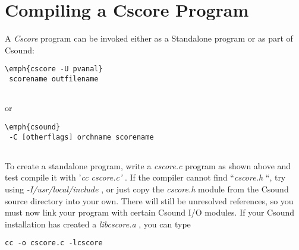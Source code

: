 \begin{comment}
\documentclass[10pt]{article}
\usepackage{fullpage, graphicx, url}
\setlength{\parskip}{1ex}
\setlength{\parindent}{0ex}
\title{Compiling a Cscore Program}



\begin{tabular}{ccc}
The Alternative Csound Reference Manual & & \\
Previous &Cscore &Next

\end{tabular}

\end{comment}
\section{Compiling a Cscore Program}


  A \emph{Cscore}
 program can be invoked either as a Standalone program or as part of Csound: 


 
\begin{lstlisting}
\emph{cscore -U pvanal}
 scorename outfilename
      
\end{lstlisting}


 
 or 

 
\begin{lstlisting}
\emph{csound}
 -C [otherflags] orchname scorename
      
\end{lstlisting}


 


  To create a standalone program, write a \emph{cscore.c}
 program as shown above and test compile it with '\emph{cc cscore.c'}
. If the compiler cannot find ``\emph{cscore.h}
``, try using \emph{-I/usr/local/include}
, or just copy the \emph{cscore.h }
module from the Csound source directory into your own. There will still be unresolved references, so you must now link your program with certain Csound\emph{ }
I/O modules. If your\emph{ }
Csound installation has created a \emph{libcscore.a}
, you can type 


 
\begin{lstlisting}
cc -o cscore.c -lcscore
      
\end{lstlisting}


